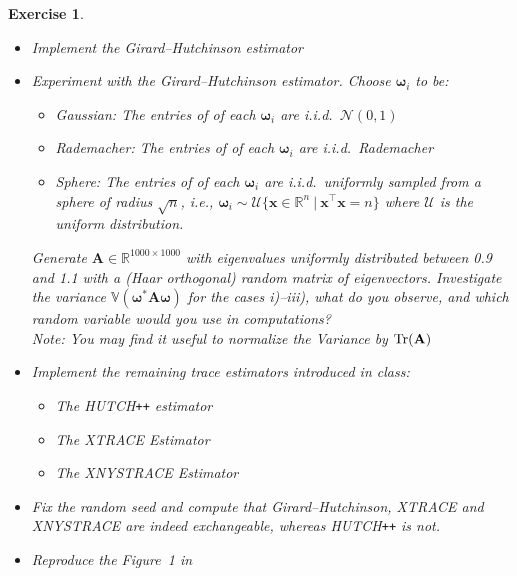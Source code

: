 \documentclass[11pt]{article}
\newcommand{\bgk}[1]{\boldsymbol{#1}}
\newcommand{\bomega}{\bgk{\omega}}
\newcommand{\bvec}[1]{\mathbf{#1}}
\newcommand{\vx}{\bvec{x}}
\newcommand{\vA}{\bvec{A}}
\newtheorem{exercise}[theorem]{Exercise}
\begin{document}
\begin{exercise}
~\\
\begin{itemize}
\item[a)] Implement the Girard--Hutchinson estimator
\item[b)] Experiment with the Girard--Hutchinson estimator. Choose $\bomega_i$ to be:
\begin{itemize}
    \item[i)] Gaussian: The entries of of each $\bomega_i$ are i.i.d.~$\mathcal{N}(0,1)$
    \item[ii)] Rademacher: The entries of of each $\bomega_i$ are i.i.d.~Rademacher
    \item[iii)] Sphere: The entries of of each $\bomega_i$ are i.i.d.~uniformly sampled from a sphere of radius $\sqrt{n}$, i.e., $\bomega_i \sim \mathcal{U}\{\vx \in \mathbb{R}^n~|~ \vx^\top \vx = n\}$ where $\mathcal{U}$ is the uniform distribution.
\end{itemize}
Generate $\vA \in \mathbb{R}^{1000\times 1000}$ with eigenvalues uniformly distributed between 0.9 and 1.1 with a (Haar orthogonal) random matrix of eigenvectors. Investigate the variance $\mathbb{V}(\bomega^* \vA \bomega)$ for the cases i)--iii), what do you observe, and which random variable would you use in computations?\\
Note: You may find it useful to normalize the Variance by ${\rm Tr}(\vA)$
\item[c)] Implement the remaining trace estimators introduced in class:
\begin{itemize}
    \item[ii)] The {\rm H\footnotesize{UTCH\texttt{++}}} estimator
    \item[iii)] The {\rm XT{\footnotesize RACE}} Estimator
    \item[iv)] The {\rm XN{\footnotesize YS}T{\footnotesize RACE}} Estimator
\end{itemize}
\item[d)] Fix the random seed and compute that Girard--Hutchinson, {\rm XT{\footnotesize RACE}} and  {\rm XN{\footnotesize YS}T{\footnotesize RACE}} are indeed exchangeable, whereas {\rm H\footnotesize{UTCH\texttt{++}}} is not.
\item[e)] Reproduce the Figure~1 in~\cite{epperly2024xtrace}
\end{itemize}

\end{exercise}



 
 
\end{document}
